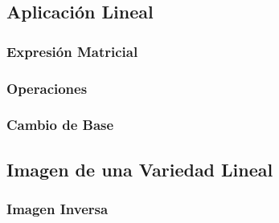 \subsection{Aplicación Lineal}
\subsubsection{Expresión Matricial}
\subsubsection{Operaciones}
\subsubsection{Cambio de Base}
\subsection{Imagen de una Variedad Lineal}
\subsubsection{Imagen Inversa}
